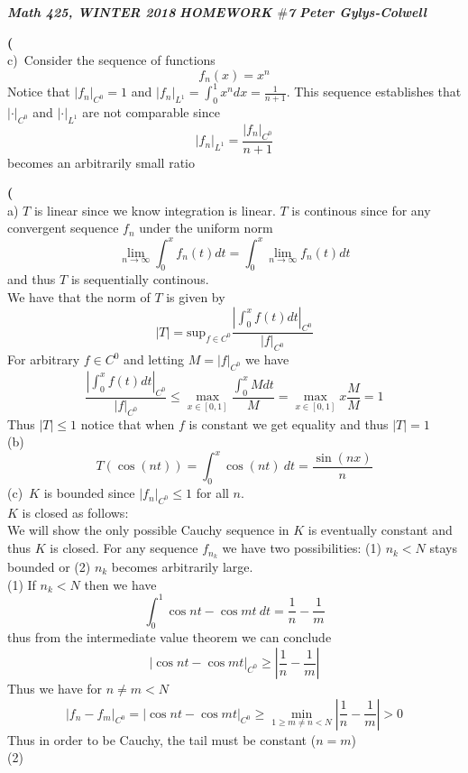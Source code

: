 \documentclass[12pt]{article}
\newenvironment{ques}[1]{\textbf{#1}\vspace{1 mm}\\ }{\bigskip}
\theoremstyle{definition}
\renewcommand{\l}{\left }
\renewcommand{\r}{\right }
\renewcommand{\sup}{\text{sup}}
\begin{document}
\noindent \textit{\textbf{Math 425, WINTER 2018}} \hspace{1.3cm}
\textit{\textbf{HOMEWORK $\#$7}} \hspace{1.3cm} \textit{\textbf{Peter
Gylys-Colwell}} 

\vspace{1cm}
\begin{ques}{7}
	(c)\ Consider the sequence of functions 
	$$f_n(x) = x^n$$
	Notice that $|f_n|_{C^0} = 1$ and $|f_n|_{L^1} = \int_0^1 x^n dx = \frac 1
	{n+1}$. This sequence establishes that $|\cdot|_{C^0}$ and $|\cdot|_{L^1}$
	are not comparable since 
	$$|f_n|_{L^1} = \frac{|f_n|_{C^0}}{n+1}$$
	becomes an arbitrarily small ratio
\end{ques}

\begin{ques}{8}
	(a) $T$ is linear since we know integration is linear. $T$ is continous
	since for any convergent sequence $f_n$ under the uniform norm 
	$$\lim_{n\to \infty} \int_0^x f_n(t) dt =  \int_0^x\lim_{n\to \infty} f_n(t) dt$$
	and thus $T$ is sequentially continous.\\
	We have that the norm of $T$ is given by 
	$$|T| = \sup_{f \in C^0} \frac{\l| \int_0^x f(t) dt \r|_{C^0}}{|f|_{C^0}}$$
	For arbitrary $f \in C^0$ and letting $M = |f|_{C^0}$ we have
	$$\frac{\l| \int_0^x f(t) dt \r|_{C^0}}{|f|_{C^0}} \leq \max_{x \in
	[0,1]}\frac{\int_0^x M dt}{M} = \max_{x \in [0,1]}x\frac M M = 1$$
	Thus $|T| \leq 1$ notice that when $f$ is constant we get equality and thus
	$|T| = 1$\\
	(b)\ 
	$$T(\cos(nt)) = \int_0^x \cos(nt)\ dt = \frac{\sin(nx)}{n}$$
	(c)\ $K$ is bounded since $|f_n|_{C^0} \leq 1$ for all $n$.\\
	$K$ is closed as follows:\\
	We will show the only possible Cauchy sequence in $K$ is eventually
	constant and thus $K$ is closed. For any sequence $f_{n_k}$ we have two
	possibilities: (1) $n_k < N$ stays bounded or (2) $n_k$ becomes arbitrarily
	large.\\
	(1) If $n_k < N$ then we have 
	$$\int_0^1 \cos nt - \cos mt\ dt = \frac 1 n - \frac 1 m$$
	thus from the intermediate value theorem we can conclude
	$$|\cos nt - \cos mt|_{C^0} \geq \l|\frac 1 n - \frac 1 m\r|$$
	Thus we have for $n \neq m < N$
	$$|f_{n} - f_{m}|_{C^0} = |\cos nt - \cos mt|_{C^0} \geq \min_{1
	\geq m \neq n < N} \l|\frac 1 n - \frac 1 m\r| > 0$$
	Thus in order to be Cauchy, the tail must be constant ($n = m$)\\
	(2)\ 
\end{ques}
\end{document}

